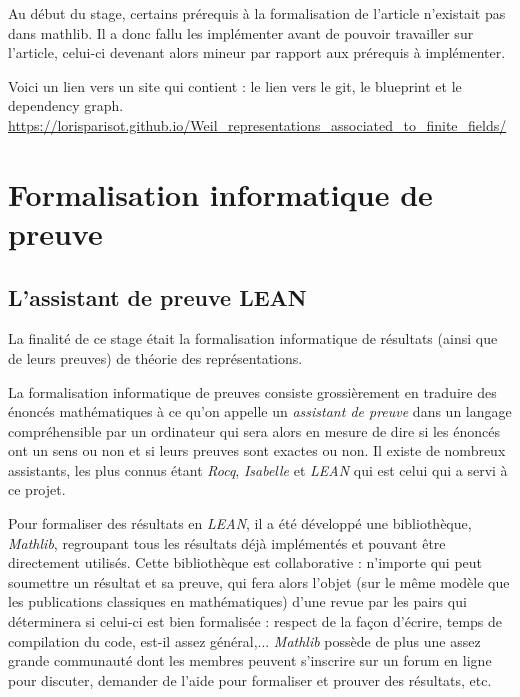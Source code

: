 \documentclass[10pt]{article}
\theoremstyle{definition}
\begin{document}
	Au début du stage, certains prérequis à la formalisation de l'article n'existait pas dans mathlib. Il a donc fallu les implémenter avant de pouvoir travailler sur l'article, celui-ci devenant alors mineur par rapport aux prérequis à implémenter.
	\newline
	
	Voici un lien vers un site qui contient : le lien vers le git, le blueprint et le dependency graph.
	\url{https://lorisparisot.github.io/Weil_representations_associated_to_finite_fields/}
\newpage

\section{Formalisation informatique de preuve}

\subsection{L'assistant de preuve LEAN} 
La finalité de ce stage était la formalisation informatique de résultats (ainsi que de leurs preuves) de théorie des représentations. 
\newline

La formalisation informatique de preuves consiste grossièrement en traduire des énoncés mathématiques à ce qu'on appelle un \textit{assistant de preuve }dans un langage compréhensible par un ordinateur qui sera alors en mesure de dire si les énoncés ont un sens ou non et si leurs preuves sont exactes ou non. Il existe de nombreux assistants, les plus connus étant \textit{Rocq}, \textit{Isabelle} et \textit{LEAN} qui est celui qui a servi à ce projet.
\newline

Pour formaliser des résultats en \textit{LEAN}, il a été développé une bibliothèque, \textit{Mathlib}, regroupant tous les résultats déjà implémentés et pouvant être directement utilisés. Cette bibliothèque est collaborative : n'importe qui peut soumettre un résultat et sa preuve, qui fera alors l'objet (sur le même modèle que les publications classiques en mathématiques) d'une revue par les pairs qui déterminera si celui-ci est \og bien formalisée \fg : respect de la façon d'écrire, temps de compilation du code, est-il assez général,...
\textit{Mathlib} possède de plus une assez grande communauté dont les membres peuvent s'inscrire sur un forum en ligne pour discuter, demander de l'aide pour formaliser et prouver des résultats, etc.
\newline
\end{document}
